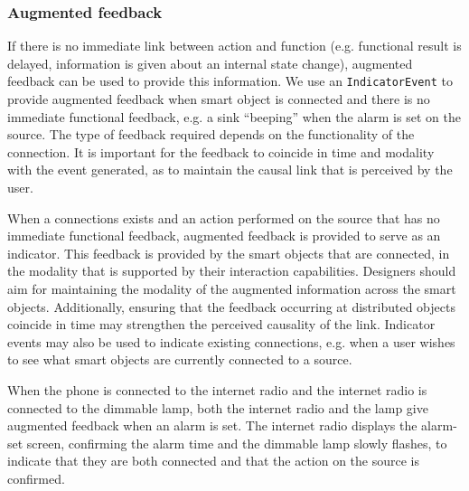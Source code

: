 \subsubsection{Augmented feedback} 
If there is no immediate link between action and function  (e.g. functional result is delayed, information is given about an internal state change), augmented feedback can be used to provide this information. We use an \texttt{IndicatorEvent} to provide augmented feedback when smart object is connected and there is no immediate functional feedback, e.g. a sink ``beeping'' when the alarm is set on the source.  The type of feedback required depends on the functionality of the connection. It is important for the feedback to coincide in time and modality with the event generated, as to maintain the causal link that is perceived by the user.

When a connections exists and an action performed on the source that has no immediate functional feedback, augmented feedback is provided to serve as an indicator. This feedback is  provided by the smart objects that are connected, in the modality that is supported by their interaction capabilities. Designers should aim for maintaining the modality of the augmented information across the smart objects. Additionally, ensuring that the feedback occurring at distributed objects coincide in time may strengthen the perceived causality of the link. Indicator events may also be used to indicate existing connections, e.g. when a user wishes to see what smart objects are currently connected to a source.  

\begin{example}
When the phone is connected to the internet radio and the internet radio is connected to the dimmable lamp, both the internet radio and the lamp give augmented feedback when an alarm is set. The internet radio displays the alarm-set screen, confirming the alarm time and the dimmable lamp slowly flashes, to indicate that they are both connected and that the action on the source is confirmed.
\end{example}




